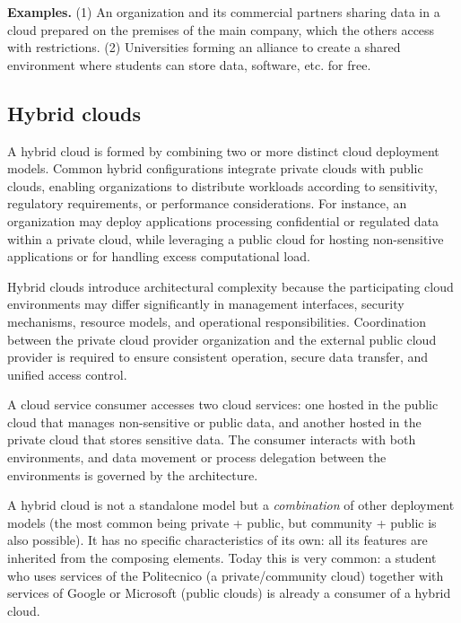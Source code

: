 \textbf{Examples.} (1) An organization and its commercial partners sharing data in a cloud prepared on the premises of the main company, which the others access with restrictions. (2) Universities forming an alliance to create a shared environment where students can store data, software, etc. for free.

\subsection{Hybrid clouds}

A hybrid cloud is formed by combining two or more distinct cloud deployment models. Common hybrid configurations integrate private clouds with public clouds, enabling organizations to distribute workloads according to sensitivity, regulatory requirements, or performance considerations. For instance, an organization may deploy applications processing confidential or regulated data within a private cloud, while leveraging a public cloud for hosting non-sensitive applications or for handling excess computational load.

Hybrid clouds introduce architectural complexity because the participating cloud environments may differ significantly in management interfaces, security mechanisms, resource models, and operational responsibilities. Coordination between the private cloud provider organization and the external public cloud provider is required to ensure consistent operation, secure data transfer, and unified access control.

A cloud service consumer accesses two cloud services: one hosted in the public cloud that manages non-sensitive or public data, and another hosted in the private cloud that stores sensitive data. The consumer interacts with both environments, and data movement or process delegation between the environments is governed by the architecture.

\begin{notebox}
	A hybrid cloud is not a standalone model but a \emph{combination} of other deployment models (the most common being private + public, but community + public is also possible). It has no specific characteristics of its own: all its features are inherited from the composing elements. Today this is very common: a student who uses services of the Politecnico (a private/community cloud) together with services of Google or Microsoft (public clouds) is already a consumer of a hybrid cloud.
\end{notebox}

